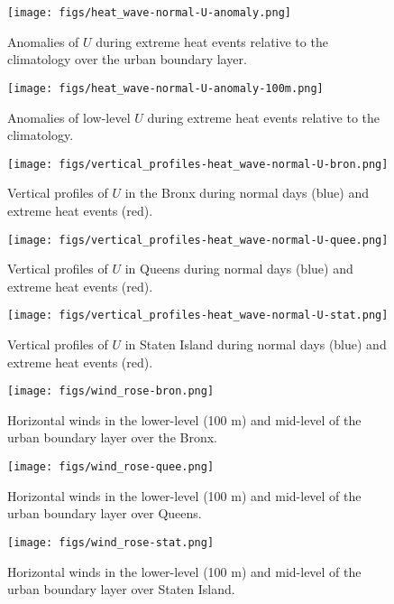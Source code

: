 \documentclass[num-refs]{wiley-article}
\begin{document}
\begin{figure}[ht]
	\centering
	\texttt{[image: figs/heat\_wave-normal-U-anomaly.png]}
	\caption{Anomalies of $U$ during extreme heat events relative to the climatology over the urban boundary layer.}
	\label{fig:extreme-heat-normal-comparison-contours-U}
\end{figure}
\begin{figure}[ht]
	\centering
	\texttt{[image: figs/heat\_wave-normal-U-anomaly-100m.png]}
	\caption{Anomalies of low-level $U$ during extreme heat events relative to the climatology.}
	\label{fig:extreme-heat-normal-100m-comparison-U}
\end{figure}
\begin{figure}[ht]
	\centering
	\texttt{[image: figs/vertical\_profiles-heat\_wave-normal-U-bron.png]}
	\caption{Vertical profiles of $U$ in the Bronx during normal days (blue) and extreme heat events (red).}
	\label{fig:vertical_profiles-heat_wave-normal-U-bron}
\end{figure}
\begin{figure}[ht]
	\centering
	\texttt{[image: figs/vertical\_profiles-heat\_wave-normal-U-quee.png]}
	\caption{Vertical profiles of $U$ in Queens during normal days (blue) and extreme heat events (red).}
	\label{fig:vertical_profiles-heat_wave-normal-U-quee}
\end{figure}
\begin{figure}[ht]
	\centering
	\texttt{[image: figs/vertical\_profiles-heat\_wave-normal-U-stat.png]}
	\caption{Vertical profiles of $U$ in Staten Island during normal days (blue) and extreme heat events (red).}
	\label{fig:vertical_profiles-heat_wave-normal-U-stat}
\end{figure}

\begin{figure}[ht]
	\centering
	\texttt{[image: figs/wind\_rose-bron.png]}
	\caption{Horizontal winds in the lower-level (100 m) and mid-level of the urban boundary layer over the Bronx.}
	\label{fig:wind_rose-bron}
\end{figure}
\begin{figure}[ht]
	\centering
	\texttt{[image: figs/wind\_rose-quee.png]}
	\caption{Horizontal winds in the lower-level (100 m) and mid-level of the urban boundary layer over Queens.}
	\label{fig:wind_rose-quee}
\end{figure}
\begin{figure}[ht]
	\centering
	\texttt{[image: figs/wind\_rose-stat.png]}
	\caption{Horizontal winds in the lower-level (100 m) and mid-level of the urban boundary layer over Staten Island.}
	\label{fig:wind_rose-stat}
\end{figure}
\end{document}
